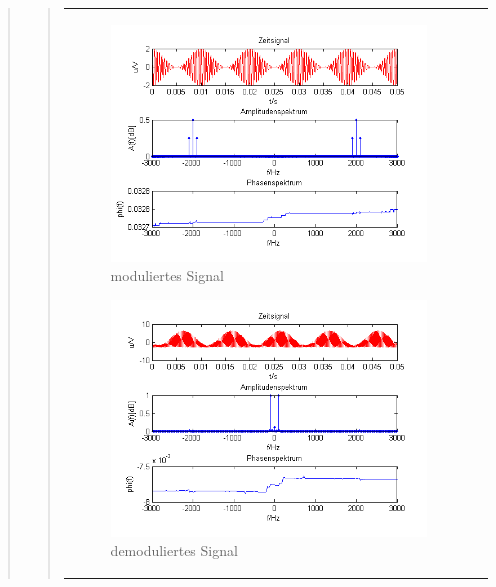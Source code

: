 \begin{quote}
\begin{quote}
\begin{center}
\begin{tabular}{ll}
\begin{minipage}{0.67\textwidth}
                \begin{figure}[H]
                    \label{fig:DemocosinusoT}
                    \includegraphics[scale=0.7]{Bilder/Am_Cos_2k_100Hz_mo}
                    \caption{moduliertes Signal}
                \end{figure}
        
            \end{minipage}
        
            \begin{minipage}{0.67\textwidth}
                \begin{figure}[H]
                    \label{fig:DemocosinusoT2}
                    \includegraphics[scale=0.7]{Bilder/Demo_Sin_2k_100Hz_mo_ohneTiefpass}
                    \caption{demoduliertes Signal}
                \end{figure}
        

\end{minipage}
\end{tabular}
\end{center}
\end{quote}
\end{quote}
